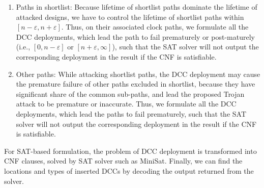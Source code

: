 \begin{enumerate}[wide, labelwidth=!, labelindent=0pt]
	\item Paths in shortlist: Because lifetime of shortlist paths dominate the lifetime of attacked designs, we have to control the lifetime of shortlist paths within $[n - \varepsilon, n + \varepsilon]$. Thus, on their associated clock paths, we formulate all the DCC deployments, which lead the path to fail prematurely or post-maturely (i.e., $[ 0, n - \varepsilon]$ or $[ n + \varepsilon, \infty]$), such that the SAT solver will not output the corresponding deployment in the result if the CNF is satisfiable.
	\item Other paths: While attacking shortlist paths, the DCC deployment may cause the premature failure of other paths excluded in shortlist, because they have significant share of the common sub-paths, and lead the proposed Trojan attack to be premature or inaccurate. %
	Thus, we formulate all the DCC deployments, which lead the paths to fail prematurely, such that the SAT solver will not output the corresponding deployment in the result if the CNF is satisfiable. 
\end{enumerate}

\begin{comment}
Consider the example in Figure~\ref{fig:sec:prefail}, where the 80\% and 20\% DCCs are inserted at the inputs of buffers 2 and 7, respectively and assume that the critical path $p$ is in shortlist. If the DCC deployment will lead $p$ to fail prematurely (i.e., within $[ 0, n - \varepsilon]$), then the following clause
\begin{gather*}
	\fontsize{8}{8} \selectfont
	\mbox{($B_{1,2} \lor B_{1,1} \lor \neg B_{2,2} \lor \neg B_{2,1}  \lor B_{3,2} \lor B_{3,1} \dots \lor B_{7,2} \lor \neg B_{7,1}$) } 
\end{gather*}
will be generated and added into the final CNF. Similarly, such DCC deployments, which lead $p$ to fail prematurely, will also be generated and added into the final CNF, such that the solver will not output the corresponding DCC deployments in the result if the CNF is satisfiable. 
\end{comment}

For SAT-based formulation, the problem of DCC deployment is transformed into CNF clauses, solved by SAT solver such as MiniSat. Finally, we can find the locations and types of inserted DCCs by decoding the output returned from the solver.



